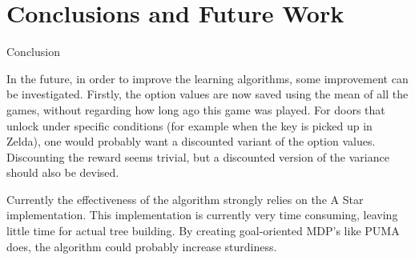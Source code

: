 \section{Conclusions and Future Work}
\label{sec:conclusion}
Conclusion

In the future, in order to improve the learning algorithms, some improvement can
be investigated. Firstly, the option values are now saved using the mean of all
the games, without regarding how long ago this game was played. For doors that
unlock under specific conditions (for example when the key is picked up in
Zelda), one would probably want a discounted variant of the option values.
Discounting the reward seems trivial, but a discounted version of the variance
should also be devised.

Currently the effectiveness of the algorithm strongly relies on the A Star
implementation. This implementation is currently very time consuming, leaving
little time for actual tree building. By creating goal-oriented MDP's like PUMA
does, the algorithm could probably increase sturdiness. 
